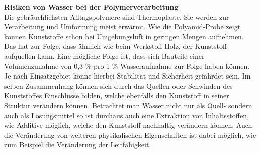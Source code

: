 \textbf{Risiken von Wasser bei der Polymerverarbeitung}\\
Die gebräuchlichsten Alltagspolymere sind Thermoplaste. Sie werden zur Verarbeitung und Umformung meist erwärmt. Wie die Polyamid-Probe zeigt können Kunststoffe schon bei Umgebungsluft in geringen Mengen aufnehmen. Das hat zur Folge, dass ähnlich wie beim Werkstoff Holz, der Kunststoff aufquellen kann. Eine mögliche Folge ist, dass sich Bauteile einer Volumenzunahme von 0,3 \% pro 1 \% Wasseraufnahme zur Folge haben können.\cite{Kaiser.2006} Je nach Einsatzgebiet könne  hierbei Stabilität und Sicherheit gefährdet sein. Im selben Zusammenhang können sich durch das Quellen oder Schwinden des Kunststoffes Einschlüsse bilden, welche ebenfalls den Kunststoff in seiner Struktur verändern können. Betrachtet man Wasser nicht nur als Quell- sondern auch als Lösungsmittel so ist durchaus auch eine Extraktion von Inhaltsstoffen, wie Additive möglich, welche den Kunststoff nachhaltig verändern können. Auch die Veränderung von weiteren physikalischen Eigenschaften ist dabei möglich, wie zum Beispiel die Veränderung der Leitfähigkeit.\cite{polymermerse} 
